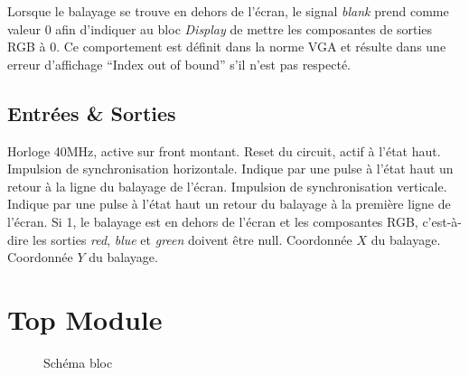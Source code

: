 \documentclass[french]{nakrule}
\begin{document}
Lorsque le balayage se trouve en dehors de l'écran, le signal \emph{blank} prend
comme valeur 0 afin d'indiquer au bloc \emph{Display} de mettre les composantes
de sorties RGB à 0. Ce comportement est définit dans la norme VGA et résulte
dans une erreur d'affichage ``Index out of bound'' s'il n'est pas respecté.

\subsection{Entrées \& Sorties}
\label{subsec:Entrees_Sorties_vga}

\begin{descr}
   Horloge 40MHz, active sur front montant.
   Reset du circuit, actif à l'état haut.
   Impulsion de synchronisation horizontale. Indique par une pulse
  à l'état haut un retour à la ligne du balayage de l'écran.
   Impulsion de synchronisation verticale. Indique par une pulse à
  l'état haut un retour du balayage à la première ligne de l'écran.
   Si 1, le balayage est en dehors de l'écran et les
  composantes RGB, c'est-à-dire les sorties \emph{red}, \emph{blue} et
  \emph{green} doivent être null.
   Coordonnée $X$ du balayage.
   Coordonnée $Y$ du balayage.
\end{descr}

\clearpage

\section{Top Module}
\label{sec:topmodule}

\begin{figure}
\caption{Schéma bloc}
\label{topModuleBloc}
\end{figure}
\end{document}
